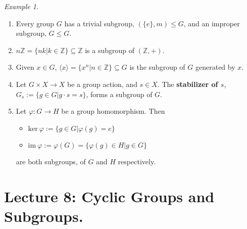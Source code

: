 \documentclass{article}
\theoremstyle{definition}
\theoremstyle{remark}
\newtheorem*{example}{Example}
\begin{document}
\begin{example}~
	\begin{enumerate}
		\item Every group $G$ has a trivial subgroup, $(\lbrace e\rbrace,m)\leq G$, and an improper subgroup, $G\leq G$.
		\item $n\mathbb{Z}=\lbrace nk|k\in\mathbb{Z}\rbrace\subseteq \mathbb{Z}$ is a subgroup of $(\mathbb{Z},+)$.
		\item Given $x\in G$, $\langle x\rangle=\lbrace x^n|n\in \mathbb{Z}\rbrace\subseteq G$ is the subgroup of $G$ generated by $x$.
		\item Let $G\times X\rightarrow X$ be a group action, and $s\in X$. The \textbf{stabilizer of $s$}, $G_s:=\lbrace g\in G|g\cdot s=s\rbrace$, forms a subgroup of $G$.
		\item Let $\varphi:G\rightarrow H$ be a group homomorphism. Then
		      \begin{itemize}
			      \item $\mathrm{ker }~\varphi:=\lbrace g\in G | \varphi(g)=e\rbrace$
			      \item $\mathrm{im }~\varphi:=\varphi(G)=\lbrace \varphi(g)\in H | g\in G\rbrace$
		      \end{itemize}
		      are both subgroups, of $G$ and $H$ respectively.
	\end{enumerate}
\end{example}
\newpage
\section{Lecture 8: Cyclic Groups and Subgroups.}
\end{document}
